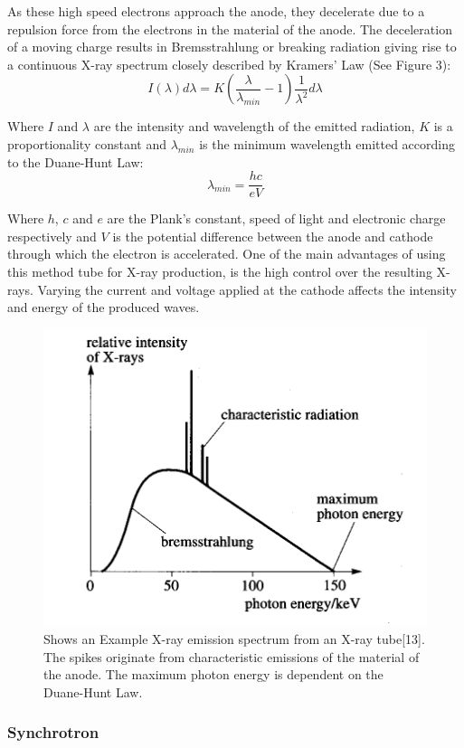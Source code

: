 \documentclass[11pt]{report}
\begin{document}
As these high speed electrons approach the anode, they decelerate due to a repulsion force from the electrons in the material of the anode. The deceleration of a moving charge results in Bremsstrahlung or breaking radiation giving rise to a continuous X-ray spectrum closely described by Kramers' Law (See Figure 3):
$$I(\lambda)d\lambda  = K(\frac{\lambda} {\lambda_{min}} - 1)\frac{1}{\lambda^{2}}d\lambda$$

Where $I$ and $\lambda$ are the intensity and wavelength of the emitted radiation, $K$ is a proportionality constant and $\lambda_{min}$ is the minimum wavelength emitted according to the Duane-Hunt Law:
$$\lambda_{min} = \frac{hc}{eV}$$

Where $h$, $c$ and $e$ are the Plank's constant, speed of light and electronic charge respectively and $V$ is the potential difference between the anode and cathode through which the electron is accelerated.
One of the main advantages of using this method tube for X-ray production, is the high control over the resulting X-rays. Varying the current and voltage applied at the cathode affects the intensity and energy of the produced waves.

\begin{figure}[h!]
\centering
\includegraphics[scale=0.8]{Bremsstrahlung.jpg}
\caption{Shows an Example X-ray emission spectrum from an X-ray tube\cite{xrayemissiondiag}[13]. The spikes originate from characteristic emissions of the material of the anode. The maximum photon energy is dependent on the Duane-Hunt Law.}
\label{2}
\end{figure}

\subsubsection{Synchrotron}
\end{document}
